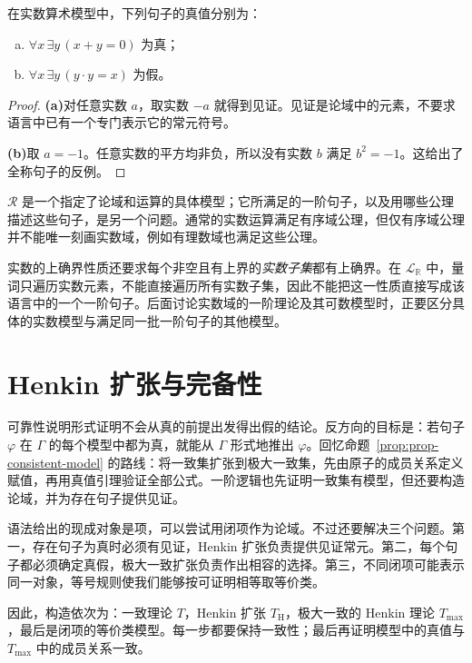 \documentclass[lang=cn,a4paper,fontset=none,zihao=false,10pt,openany,twoside]{beautybook}
\numberwithin{algorithm}{chapter}
\newcommand{\R}{\mathbb R}
\begin{document}
\begin{example}
在实数算术模型中，下列句子的真值分别为：
\begin{enumerate}[(a)]
\item $\forall x\,\exists y\,(x+y=0)$ 为真；
\item $\forall x\,\exists y\,(y\cdot y=x)$ 为假。
\end{enumerate}
\end{example}
\begin{proof}
\par\smallskip\noindent\textbf{(a)}\quad 对任意实数 $a$，取实数 $-a$ 就得到见证。见证是论域中的元素，不要求语言中已有一个专门表示它的常元符号。

\par\smallskip\noindent\textbf{(b)}\quad 取 $a=-1$。任意实数的平方均非负，所以没有实数 $b$ 满足 $b^2=-1$。这给出了全称句子的反例。
\end{proof}

\begin{remark}[模型与公理的区别]
$\mathcal R$ 是一个指定了论域和运算的具体模型；它所满足的一阶句子，以及用哪些公理描述这些句子，是另一个问题。通常的实数运算满足有序域公理，但仅有序域公理并不能唯一刻画实数域，例如有理数域也满足这些公理。

实数的上确界性质还要求每个非空且有上界的\emph{实数子集}都有上确界。在 $\mathcal L_{\R}$ 中，量词只遍历实数元素，不能直接遍历所有实数子集，因此不能把这一性质直接写成该语言中的一个一阶句子。后面讨论实数域的一阶理论及其可数模型时，正要区分具体的实数模型与满足同一批一阶句子的其他模型。
\end{remark}

\section{Henkin 扩张与完备性}
可靠性说明形式证明不会从真的前提出发得出假的结论。反方向的目标是：若句子 $\varphi$ 在 $\Gamma$ 的每个模型中都为真，就能从 $\Gamma$ 形式地推出 $\varphi$。回忆命题~\ref{prop:prop-consistent-model} 的路线：将一致集扩张到极大一致集，先由原子的成员关系定义赋值，再用真值引理验证全部公式。一阶逻辑也先证明一致集有模型，但还要构造论域，并为存在句子提供见证。

\begin{remark}[构造模型的思路]
语法给出的现成对象是项，可以尝试用闭项作为论域。不过还要解决三个问题。第一，存在句子为真时必须有见证，Henkin 扩张负责提供见证常元。第二，每个句子都必须确定真假，极大一致扩张负责作出相容的选择。第三，不同闭项可能表示同一对象，等号规则使我们能够按可证明相等取等价类。

因此，构造依次为：一致理论 $T$，Henkin 扩张 $T_{\mathrm H}$，极大一致的 Henkin 理论 $T_{\max}$，最后是闭项的等价类模型。每一步都要保持一致性；最后再证明模型中的真值与 $T_{\max}$ 中的成员关系一致。
\end{remark}
\end{document}
